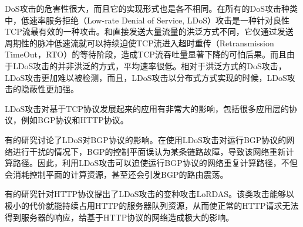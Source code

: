 DoS攻击的危害性很大，而且它的实现形式也是各不相同。在所有的DoS攻击种类中，低速率服务拒绝（Low-rate Denial of Service, LDoS）攻击\cite{LDoS}是一种针对良性TCP流最有效的一种攻击。和直接发送大量流量的洪泛方式不同，它仅通过发送周期性的脉冲低速流就可以持续迫使TCP流进入超时重传（Retransmission TimeOut，RTO）的等待阶段，造成TCP流吞吐量显著下降的可怕后果。而且由于LDoS攻击的并非洪泛的方式，平均速率很低。相对于洪泛方式的DoS攻击，LDoS攻击更加难以被检测，而且，LDoS攻击以分布式方式实现的时候，LDoS攻击的隐蔽性更加强。

LDoS攻击对基于TCP协议发展起来的应用有非常大的影响，包括很多应用层的协议，例如BGP协议和HTTP协议。

有的研究\cite{b2}讨论了LDoS对BGP协议的影响。在使用LDoS攻击对运行BGP协议的网络进行干扰的情况下，BGP的控制平面误认为某条链路故障，导致该网络重新计算路径。因此，利用LDoS攻击可以迫使运行BGP协议的网络重复计算路径，不但会消耗控制平面的计算资源，甚至还会引发BGP的路由震荡。

有的研究\cite{Maci2007LoRDAS}针对HTTP协议提出了LDoS攻击的变种攻击LoRDAS。该类攻击能够以极小的代价就能持续占用HTTP的服务器队列资源，从而使正常的HTTP请求无法得到服务器的响应，给基于HTTP协议的网络造成极大的影响。


